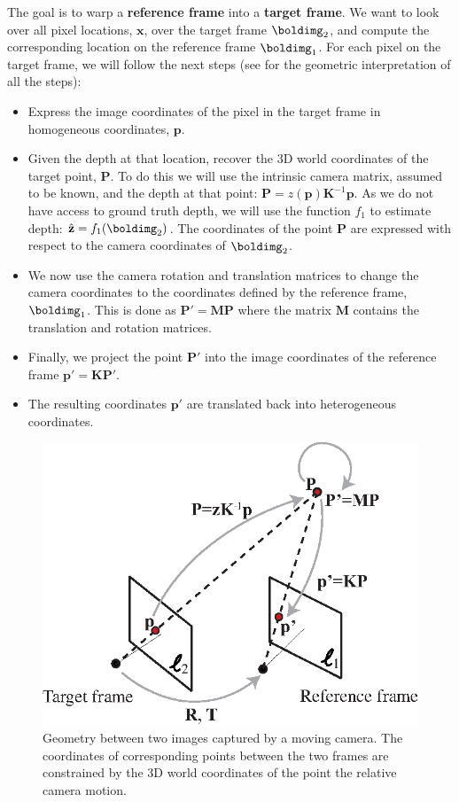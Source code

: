 The goal is to warp a {\bf reference frame} into a {\bf target frame}.
We want to look over all pixel locations, $\mathbf{x}$, over the target frame $\boldimg_2$, and compute the corresponding location on the reference frame $\boldimg_1$. For each pixel on the target frame, we will follow the next steps (see \fig{\ref{fig:geometry_reconstruction}} for the geometric interpretation of all the steps):
\begin{itemize}
    \item Express the image coordinates of the pixel in the target frame in homogeneous coordinates, $\mathbf{p}$.
    \item Given the depth at that location, recover the 3D world coordinates of the target point, $\mathbf{P}$. To do this we will use the intrinsic camera matrix, assumed to be known, and the depth at that point: $\mathbf{P} = z(\mathbf{p}) \mathbf{K}^{-1} \mathbf{p}$. As we do not have access to ground truth depth, we will use the function $f_1$ to estimate depth: $\hat{\mathbf{z}} = f_1(\boldimg_2)$. The coordinates of the point $\mathbf{P}$ are expressed with respect to the camera coordinates of $\boldimg_2$.
    \item We now use the camera rotation and translation matrices to change the camera coordinates to the coordinates defined by the reference frame, $\boldimg_1$. This is done as $\mathbf{P}' = \mathbf{M}\mathbf{P}$ where the matrix $\mathbf{M}$ contains the translation and rotation matrices.
    \item Finally, we project the point $\mathbf{P}'$ into the image coordinates of the reference frame $\mathbf{p}' = \mathbf{K} \mathbf{P}'$.
    \item The resulting coordinates $\mathbf{p}'$ are translated back into heterogeneous coordinates.
\end{itemize}

\begin{figure}
    \centerline{
        \includegraphics[width=.6\linewidth]{figures/learning_3d/geometry_reconstruction_12.eps}
    }
    \caption{Geometry between two images captured by a moving camera. The coordinates of corresponding points between the two frames are constrained by the 3D world coordinates of the point the relative camera motion.}
    \label{fig:geometry_reconstruction}
\end{figure}

